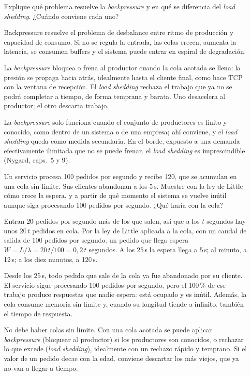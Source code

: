 \documentclass[variant=guia,cover=institutional,mode=screen]{ua-engineering-v6-article}
\begin{document}
\begin{uaexercise}
Explique qué problema resuelve la \emph{backpressure} y en qué se diferencia del \emph{load shedding}. ¿Cuándo conviene cada uno?
\end{uaexercise}
\begin{uaanswer}
Backpressure resuelve el problema de desbalance entre ritmo de producción y capacidad de consumo. Si no se regula la entrada, las colas crecen, aumenta la latencia, se consumen buffers y el sistema puede entrar en espiral de degradación.

La \emph{backpressure} bloquea o frena al productor cuando la cola acotada se llena: la presión se propaga hacia atrás, idealmente hasta el cliente final, como hace TCP con la ventana de recepción. El \emph{load shedding} rechaza el trabajo que ya no se podrá completar a tiempo, de forma temprana y barata. Uno desacelera al productor; el otro descarta trabajo.

La \emph{backpressure} solo funciona cuando el conjunto de productores es finito y conocido, como dentro de un sistema o de una empresa; ahí conviene, y el \emph{load shedding} queda como medida secundaria. En el borde, expuesto a una demanda efectivamente ilimitada que no se puede frenar, el \emph{load shedding} es imprescindible (Nygard, caps.~5 y 9).
\end{uaanswer}

\begin{uaexercise}
Un servicio procesa 100 pedidos por segundo y recibe 120, que se acumulan en una cola sin límite. Sus clientes abandonan a los 5\,s. Muestre con la ley de Little cómo crece la espera, y a partir de qué momento el sistema se vuelve inútil aunque siga procesando 100 pedidos por segundo. ¿Qué haría con la cola?
\end{uaexercise}
\begin{uaanswer}
Entran 20 pedidos por segundo más de los que salen, así que a los $t$ segundos hay unos $20\,t$ pedidos en cola. Por la ley de Little aplicada a la cola, con un caudal de salida de 100 pedidos por segundo, un pedido que llega espera $W = L / \lambda = 20\,t / 100 = 0{,}2\,t$ segundos. A los 25\,s la espera llega a 5\,s; al minuto, a 12\,s; a los diez minutos, a 120\,s.

Desde los 25\,s, todo pedido que sale de la cola ya fue abandonado por su cliente. El servicio sigue procesando 100 pedidos por segundo, pero el 100\,\% de ese trabajo produce respuestas que nadie espera: está ocupado y es inútil. Además, la cola consume memoria sin límite y, cuando su longitud tiende a infinito, también el tiempo de respuesta.

No debe haber colas sin límite. Con una cola acotada se puede aplicar \emph{backpressure} (bloquear al productor) si los productores son conocidos, o rechazar lo que excede (\emph{load shedding}), idealmente con un rechazo rápido y temprano. Si el valor de un pedido decae con la edad, conviene descartar los más viejos, que ya no van a llegar a tiempo.
\end{uaanswer}
\end{document}
